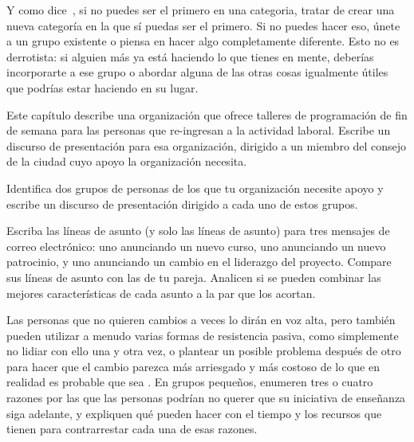 Y como dice~\cite{Kuch2011},
si no puedes ser el primero en una categoria,
tratar de crear una nueva categoría en la que sí puedas ser el primero.
Si no puedes hacer eso,
únete a un grupo existente o piensa en hacer algo completamente diferente.
Esto no es derrotista:
si alguien más ya está haciendo lo que tienes en mente,
deberías incorporarte a ese grupo o abordar alguna de las otras cosas igualmente útiles
que podrías estar haciendo en su lugar.



Este capítulo describe una organización
que ofrece talleres de programación de fin de semana para las personas que re-ingresan a la actividad laboral.
Escribe un discurso de presentación para esa organización,
dirigido a un miembro del consejo de la ciudad cuyo apoyo la organización necesita.


Identifica dos grupos de personas de los que tu organización necesite apoyo
y escribe un discurso de presentación dirigido a cada uno de estos grupos.


Escriba las líneas de asunto (y solo las líneas de asunto) para tres mensajes de correo electrónico:
uno anunciando un nuevo curso,
uno anunciando un nuevo patrocinio,
y uno anunciando un cambio en el liderazgo del proyecto.
Compare sus líneas de asunto con las de tu pareja.
Analicen  si se pueden combinar las mejores características de cada asunto a la par que los acortan.


Las personas que no quieren cambios a veces lo dirán en voz alta,
pero también pueden utilizar a menudo varias formas de resistencia pasiva,
como simplemente no lidiar con ello una y otra vez,
o plantear un posible problema después de otro 
para hacer que el cambio parezca más arriesgado y más costoso de lo que en realidad es probable que sea
\cite {Scot1987}.
En grupos pequeños,
enumeren tres o cuatro razones por las que las personas podrían no querer que su iniciativa de enseñanza siga adelante,
y expliquen qué pueden hacer con el tiempo y los recursos que tienen para contrarrestar cada una de esas razones.

